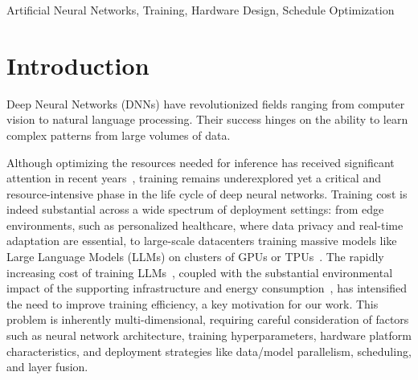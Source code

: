 \documentclass[lettersize,journal]{IEEEtran}
\begin{document}
\begin{IEEEkeywords}
Artificial Neural Networks, Training, Hardware Design, Schedule Optimization
\end{IEEEkeywords}

\section{Introduction}

Deep Neural Networks (DNNs) have revolutionized fields ranging from computer vision to natural language processing. Their success hinges on the ability to learn complex patterns from large volumes of data. 

Although optimizing the resources needed for inference has received significant attention in recent years~\cite{groq2022lpu, Cerebras2023WSE}, training remains underexplored yet a critical and resource-intensive phase in the life cycle of deep neural networks. Training cost is indeed substantial across a wide spectrum of deployment settings: from edge environments, such as personalized healthcare, where data privacy and real-time adaptation are essential, to large-scale datacenters training massive models like Large Language Models (LLMs) on clusters of GPUs or TPUs~\cite{google2020tpuv2}. The rapidly increasing cost of training LLMs~\cite{cottier2024rising}, coupled with the substantial environmental impact of the supporting infrastructure and energy consumption~\cite{luccioni2023estimating}, has intensified the need to improve training efficiency, a key motivation for our work. This problem is inherently multi-dimensional, requiring careful consideration of factors such as neural network architecture, training hyperparameters, hardware platform characteristics, and deployment strategies like data/model parallelism, scheduling, and layer fusion.
\end{document}
